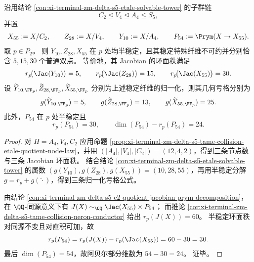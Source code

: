 \begin{corollary}\label{cor:xi-terminal-zm-delta-s5-tame-collision-etale-solvable-tower-reduction-data}
沿用结论 \ref{con:xi-terminal-zm-delta-s5-etale-solvable-tower} 的子群链
\[
C_2\trianglelefteq V_4\trianglelefteq A_4\le S_5,
\]
并置
\[
X_{55}:=X/C_2,\qquad Z_{28}:=X/V_4,\qquad Y_{10}:=X/A_4,\qquad P_{54}:=\Prym(X\to X_{55}).
\]
取 \(p\in P_2\)。
则 \(Y_{10},Z_{28},X_{55}\) 在 \(p\) 处均半稳定，且其稳定特殊纤维不可约并分别恰含 \(5,15,30\) 个普通双点。
等价地，其 Jacobian 的环面秩满足
\[
r_p\!\bigl(\Jac(Y_{10})\bigr)=5,\qquad
r_p\!\bigl(\Jac(Z_{28})\bigr)=15,\qquad
r_p\!\bigl(\Jac(X_{55})\bigr)=30.
\]
设 \(\widetilde Y_{10,\FF_p},\widetilde Z_{28,\FF_p},\widetilde X_{55,\FF_p}\) 分别为上述稳定纤维的归一化，则其几何亏格分别为
\[
g(\widetilde Y_{10,\FF_p})=5,\qquad
g(\widetilde Z_{28,\FF_p})=13,\qquad
g(\widetilde X_{55,\FF_p})=25.
\]
此外，\(P_{54}\) 在 \(p\) 处半稳定且
\[
r_p(P_{54})=30,
\qquad
\dim(P_{54})-r_p(P_{54})=24.
\]
\end{corollary}
\begin{proof}
对 \(H=A_4,V_4,C_2\) 应用命题 \ref{prop:xi-terminal-zm-delta-s5-tame-collision-etale-quotient-node-law}，并用 \((|A_4|,|V_4|,|C_2|)=(12,4,2)\)，得到三条节点数与三条 Jacobian 环面秩。
结合结论 \ref{con:xi-terminal-zm-delta-s5-etale-solvable-tower} 的属数
\(
(g(Y_{10}),g(Z_{28}),g(X_{55}))=(10,28,55)
\)，再用半稳定分解 \(g=r_p+g(\widetilde{\cdot})\)，得到三条归一化亏格公式。
\par
由结论 \ref{con:xi-terminal-zm-delta-s5-c2-quotient-jacobian-prym-decomposition}，在 \(\QQ\)-同源意义下有
\(
J(X)\sim_{\QQ}\Jac(X_{55})\times P_{54}
\)；
而推论 \ref{cor:xi-terminal-zm-delta-s5-tame-collision-neron-conductor} 给出 \(r_p(J(X))=60\)。
半稳定环面秩对同源不变且对直积可加，故
\[
r_p(P_{54})=r_p(J(X))-r_p(\Jac(X_{55}))=60-30=30.
\]
最后 \(\dim(P_{54})=54\)，故阿贝尔部分维数为 \(54-30=24\)。
证毕。
\end{proof}

\endinput
